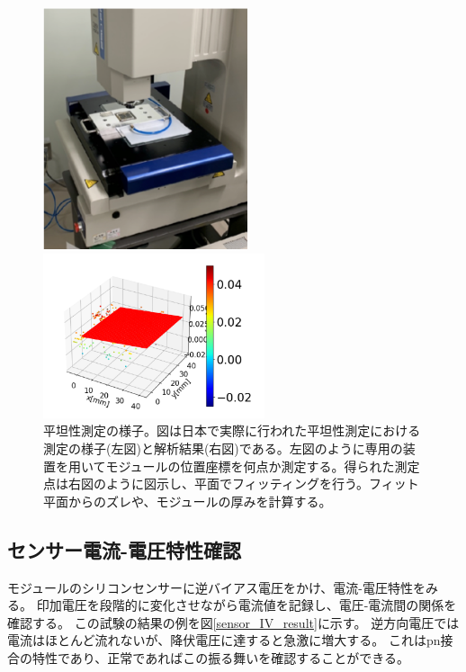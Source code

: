\begin{figure}[bpt]\centering
  \begin{minipage}{0.4\hsize}
    \begin{center}
    \includegraphics[width=60mm]{./Metrology_setup.png}
    \end{center}
  \end{minipage}
  \begin{minipage}{0.4\hsize}
    \begin{center}
    \includegraphics[width=65mm]{./Metrology_analysis.png}
    \end{center}
  \end{minipage}
  \caption[平坦性測定の様子]{平坦性測定の様子。図は日本で実際に行われた平坦性測定における測定の様子(左図)と解析結果(右図)である。左図のように専用の装置を用いてモジュールの位置座標を何点か測定する。得られた測定点は右図のように図示し、平面でフィッティングを行う。フィット平面からのズレや、モジュールの厚みを計算する。}
  \label{Metrology_overview}
\end{figure}

\clearpage
\subsection{センサー電流-電圧特性確認}
モジュールのシリコンセンサーに逆バイアス電圧をかけ、電流-電圧特性をみる。
印加電圧を段階的に変化させながら電流値を記録し、電圧-電流間の関係を確認する。
この試験の結果の例を図\ref{sensor_IV_result}に示す。
逆方向電圧では電流はほとんど流れないが、降伏電圧に達すると急激に増大する。
これはpn接合の特性\cite{2-1}であり、正常であればこの振る舞いを確認することができる。


